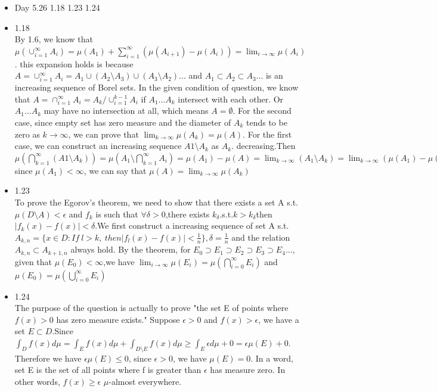 \documentclass{article}
\begin{document}
\begin{itemize}
\item Day 5.26 1.18 1.23 1.24\\
\item 1.18\\
By 1.6, we know that $\mu(\cup_{i = 1}^\infty A_i) = \mu(A_1) + \sum_{i=1}^{\infty}(\mu(A_{i+1}) - \mu(A_{i}))=\lim_{i \rightarrow \infty}\mu(A_i)$. this expansion holds is because $A = \cup_{i = 1}^\infty A_i = A_1 \cup (A_2 \setminus A_3) \cup (A_3 \setminus A_2)...$ and $A_1 \subset A_2 \subset A_3...$ is an increasing sequence of Borel sets. In the given condition of question,  we know that $A = \cap_{i = 1}^\infty A_i = A_k / \cup_{i=1}^{k-1}A_i$ if $A_1...A_k$ intersect with each other. Or $A_1 ...A_k$ may have no intersection at all, which means $A = \emptyset$. For the second case, since empty set has zero measure and the diameter of $A_k$ tends to be zero as $k \rightarrow \infty$, we can prove that $\lim_{k\rightarrow \infty}\mu(A_k) = \mu(A)$.
For the first case, we can construct an increasing sequence ${A1 \setminus A_k}$ as ${A_k} $. decreasing.Then $\mu(\bigcap_{k=1}^{\infty}(A1 \setminus A_k)) = \mu(A_1 \setminus \bigcap_{k=1}^{\infty}A_i) = \mu(A_1) - \mu(A) = \lim_{k \rightarrow \infty}(A_1 \setminus A_k) = \lim_{k \rightarrow \infty}(\mu(A_1) - \mu(A_k)) = \mu(A_1) - \lim_{k \rightarrow \infty}\mu(A_k)$\\
since $\mu(A_1) < \infty$, we can say that $\mu(A) = \lim_{k \rightarrow \infty}\mu(A_k)$\\

\item 1.23\\
To prove the Egorov's theorem, we need to show that there exists a set A s.t. $\mu(D\setminus A) < \epsilon$ and ${f_k}$ is such that $\forall \delta >0$,there exists $k_\delta$.s.t.$k > k_\delta$then $| f_k(x) - f(x) | < \delta$.We first construct a increasing sequence of set A s.t. $A_{k,n} = \{x \in D: If \ l > k, \ then |f_l(x) - f(x)| < \frac{1}{n}\},\delta = \frac{1}{n}$ and the relation $A_{k,n} \subset A_{k+1,n}$ always hold. By the theorem, for $E_0 \supset E_1 \supset E_2 \supset E_3 \supset E_4...$, given that $\mu(E_0) < \infty$,we have $\lim_{i \rightarrow \infty}\mu(E_i) = \mu(\bigcap_{i=0}^{\infty}E_i)$ and $\mu(E_0) = \mu(\bigcup_{i=0}^{\infty}E_i)$

\item 1.24\\
The purpose of the question is actually to prove "the set E of points where $f(x) > 0$ has zero measure exists." Suppose $\epsilon > 0$ and $f(x) > \epsilon$, we have a set $E \subset D$.Since $\int_D f(x)d\mu = \int_E f(x)d\mu + \int_{D\setminus E}f(x)d\mu \geq \int_E \epsilon d\mu + 0 = \epsilon \mu(E) + 0$. Therefore we have $\epsilon \mu(E) \leq 0$, since $\epsilon > 0$, we have $\mu(E) = 0$. In a word, set E is the set of all points where f is greater than $\epsilon$ has measure zero. In other words, $f(x)\geq \epsilon$ $\mu$-almost everywhere. 



\end{itemize}
\end{document}
